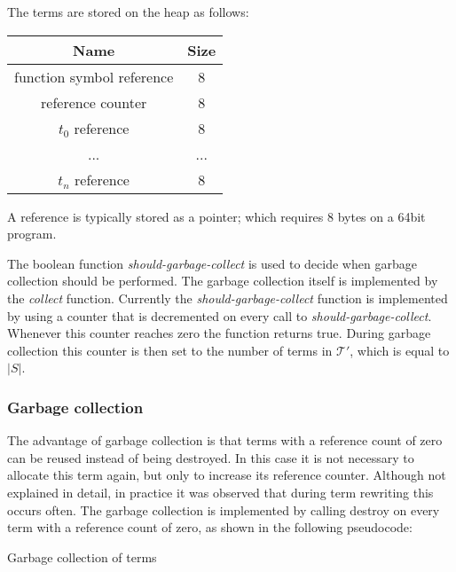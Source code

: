\documentclass[10pt,a4paper]{article}
\newcommand{\terms}{\mathcal{T}}
\begin{document}
\noindent The terms are stored on the heap as follows:

\begin{center}
\begin{tabular}{|c|c|}
\hline
Name & Size \\ \hline
function symbol reference & 8 \\ \hline 
reference counter & 8 \\ \hline
$t_0$ reference & 8 \\ \hline
... & ... \\ \hline
$t_n$ reference & 8 \\ \hline
\end{tabular}
\end{center}

\noindent A reference is typically stored as a pointer; which requires 8 bytes on a 64bit program.

The boolean function \emph{should-garbage-collect} is used to decide when garbage collection should be performed.
The garbage collection itself is implemented by the \emph{collect} function.
Currently the \emph{should-garbage-collect} function is implemented by using a counter that is decremented on every call to \emph{should-garbage-collect}.
Whenever this counter reaches zero the function returns true.
During garbage collection this counter is then set to the number of terms in $\terms'$, which is equal to $|S|$.

\subsubsection{Garbage collection}


The advantage of garbage collection is that terms with a reference count of zero can be reused instead of being destroyed.
In this case it is not necessary to allocate this term again, but only to increase its reference counter. 
Although not explained in detail, in practice it was observed that during term rewriting this occurs often. 
The garbage collection is implemented by calling destroy on every term with a reference count of zero, as shown in the following pseudocode:

\begin{algorithm}[H]
\caption{Garbage collection of terms}\label{alg:collect}
\begin{algorithmic}[1]
	\For {$t \in \terms'$}
    \EndIf
  \EndFor
  
  \State{collect-countdown $\gets |\terms'|$ }
\EndProcedure
\end{algorithmic}
\end{algorithm}
\end{document}
